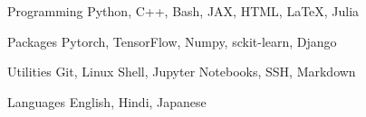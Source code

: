 

\begin{cvskills}

  \cvskill
    {Programming} %
    {Python, C++, Bash, JAX, HTML, \LaTeX, Julia} %

  \cvskill
    {Packages} %
    {Pytorch, TensorFlow, Numpy, sckit-learn, Django} %
    

  \cvskill
    {Utilities} %
    {Git, Linux Shell, Jupyter Notebooks, SSH, Markdown} %


  \cvskill
{Languages} %
{English, Hindi, Japanese} %




\end{cvskills}